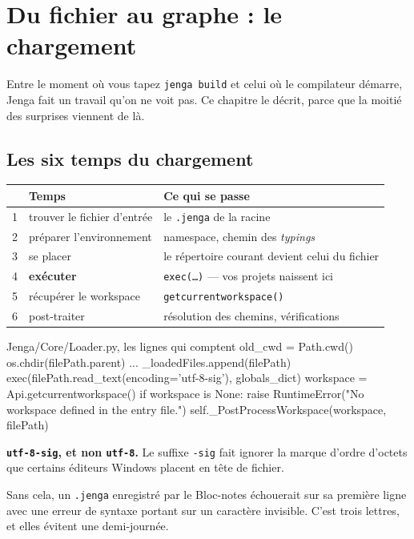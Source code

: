 \chapter{Du fichier au graphe : le chargement}

Entre le moment où vous tapez \texttt{jenga build} et celui où le compilateur
démarre, Jenga fait un travail qu'on ne voit pas. Ce chapitre le décrit, parce
que la moitié des surprises viennent de là.

\section{Les six temps du chargement}

\begin{center}
\begin{tabular}{@{}rll@{}}
\toprule
& \textbf{Temps} & \textbf{Ce qui se passe} \\
\midrule
1 & trouver le fichier d'entrée & le \texttt{.jenga} de la racine \\
2 & préparer l'environnement & namespace, chemin des \emph{typings} \\
3 & se placer & le répertoire courant devient celui du fichier \\
4 & \textbf{exécuter} & \texttt{exec(\dots)} --- vos projets naissent ici \\
5 & récupérer le workspace & \texttt{getcurrentworkspace()} \\
6 & post-traiter & résolution des chemins, vérifications \\
\bottomrule
\end{tabular}
\end{center}

\begin{nkcode}{Jenga/Core/Loader.py, les lignes qui comptent}
old_cwd = Path.cwd()
os.chdir(filePath.parent)
...
_loadedFiles.append(filePath)
exec(filePath.read_text(encoding='utf-8-sig'), globals_dict)
workspace = Api.getcurrentworkspace()
if workspace is None:
    raise RuntimeError("No workspace defined in the entry file.")
self._PostProcessWorkspace(workspace, filePath)
\end{nkcode}

\begin{nkretenir}
\textbf{\texttt{utf-8-sig}, et non \texttt{utf-8}.} Le suffixe \texttt{-sig} fait
ignorer la marque d'ordre d'octets que certains éditeurs Windows placent en tête
de fichier.

Sans cela, un \texttt{.jenga} enregistré par le Bloc-notes échouerait sur sa
première ligne avec une erreur de syntaxe portant sur un caractère invisible.
C'est trois lettres, et elles évitent une demi-journée.
\end{nkretenir}

